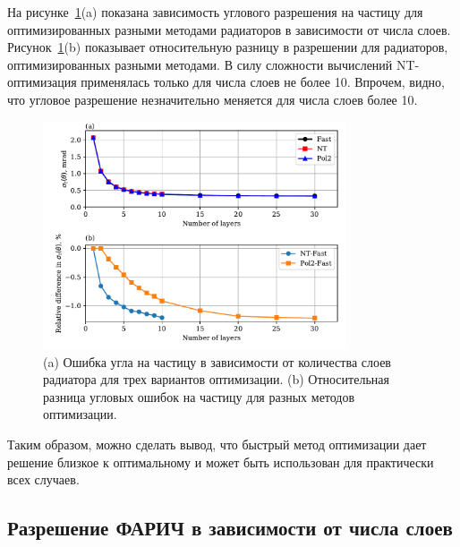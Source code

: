 \documentclass[12pt]{article}
\begin{document}
На рисунке~\ref{fig:layersmethcomp}(a) показана зависимость углового разрешения на частицу 
для оптимизированных разными методами радиаторов в зависимости от числа слоев. Рисунок~\ref{fig:layersmethcomp}(b) показывает
относительную разницу в разрешении для радиаторов, оптимизированных разными методами.
В силу сложности вычислений NT-оптимизация применялась только для числа слоев не более 10. Впрочем, видно, что угловое разрешение
незначительно меняется для числа слоев более 10.
\begin{figure}[htbp]
\begin{center}
\includegraphics[width=0.8\textwidth]{sigtang_vs_layers_varopt.pdf}
\caption{(a) Ошибка угла на частицу в зависимости от количества слоев радиатора для трех вариантов оптимизации. 
(b) Относительная разница угловых ошибок на частицу для разных методов оптимизации.}
\label{fig:layersmethcomp}
\end{center}
\end{figure}

Таким образом, можно сделать вывод, что быстрый метод оптимизации дает решение близкое к оптимальному и может быть использован для практически всех случаев.

\subsection{Разрешение ФАРИЧ в зависимости от числа слоев}
\end{document}
